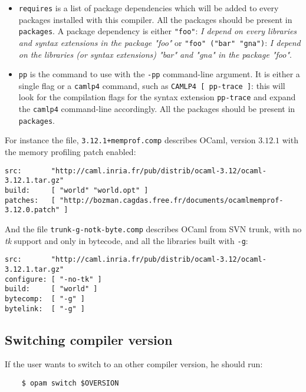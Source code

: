 \documentclass[a4paper,11pt]{article}
\begin{document}
\begin{itemize}
\item {\tt requires} is a list of package dependencies which will be
  added to every packages installed with this compiler. All the
  packages should be present in {\tt packages}.
  A package dependency is either {\tt "foo"}: {\em I depend on every
  libraries and syntax extensions in the package "foo"} or {\tt "foo"
    ("bar" "gna")}: {\em I depend on the libraries (or syntax
    extensions) "bar" and "gna" in the package "foo"}.

\item {\tt pp} is the command to use with the {\tt -pp} command-line
  argument. It is either a single flag or a {\tt camlp4} command,
  such as {\tt CAMLP4 [ pp-trace ]}: this will look for the
  compilation flags for the syntax extension {\tt pp-trace} and expand
  the {\tt camlp4} command-line accordingly. All the packages should
  be present in {\tt packages}.

\end{itemize}

For instance the file, {\tt 3.12.1+memprof.comp} describes OCaml,
version $3.12.1$ with the memory profiling patch enabled:

\begin{verbatim}
src:       "http://caml.inria.fr/pub/distrib/ocaml-3.12/ocaml-3.12.1.tar.gz"
build:     [ "world" "world.opt" ]
patches:   [ "http://bozman.cagdas.free.fr/documents/ocamlmemprof-3.12.0.patch" ]
\end{verbatim}

And the file {\tt trunk-g-notk-byte.comp} describes OCaml from SVN
trunk, with no {\em tk} support and only in bytecode, and all the
libraries built with {\tt -g}:

\begin{verbatim}
src:       "http://caml.inria.fr/pub/distrib/ocaml-3.12/ocaml-3.12.1.tar.gz"
configure: [ "-no-tk" ]
build:     [ "world" ]
bytecomp:  [ "-g" ]
bytelink:  [ "-g" ]
\end{verbatim}

\subsection{Switching compiler version}

If the user wants to switch to an other compiler version, he should run:

\begin{verbatim}
    $ opam switch $OVERSION
\end{verbatim}
\end{document}
